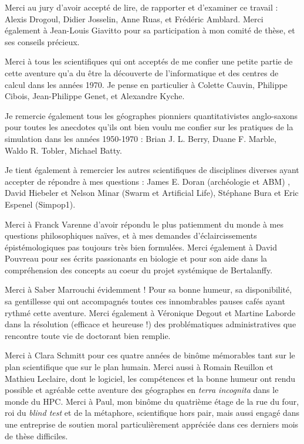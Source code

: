 \medskip
Merci au jury d’avoir accepté de lire, de rapporter et d’examiner ce travail : Alexis Drogoul, Didier Josselin, Anne Ruas, et Frédéric Amblard. Merci également à Jean-Louis Giavitto pour sa participation à mon comité de thèse, et ses conseils précieux.

\medskip
Merci à tous les scientifiques qui ont acceptés de me confier une petite partie de cette aventure qu’a du être la découverte de l’informatique et des centres de calcul dans les années 1970. Je pense en particulier à Colette Cauvin, Philippe Cibois, Jean-Philippe Genet, et Alexandre Kyche.

\medskip
Je remercie également tous les géographes pionniers quantitativistes anglo-saxons pour toutes les anecdotes qu’ils ont bien voulu me confier sur les pratiques de la simulation dans les années 1950-1970 : Brian J. L. Berry, Duane F. Marble, Waldo R. Tobler, Michael Batty.

\medskip
Je tient également à remercier les autres scientifiques de disciplines diverses ayant accepter de répondre à mes questions : James E. Doran (archéologie et ABM) , David Hiebeler et Nelson Minar (Swarm et Artificial Life), Stéphane Bura et Eric Espenel (Simpop1).

\medskip
Merci à Franck Varenne d’avoir répondu le plus patiemment du monde à mes questions philosophiques naïves, et à mes demandes d’éclaircissements épistémologiques pas toujours très bien formulées. Merci également à David Pouvreau pour ses écrits passionants en biologie et pour son aide dans la compréhension des concepts au coeur du projet systémique de Bertalanffy.

\medskip
Merci à Saber Marrouchi évidemment ! Pour sa bonne humeur, sa disponibilité, sa gentillesse qui ont accompagnés toutes ces innombrables pauses cafés ayant rythmé cette aventure. Merci également à Véronique Degout et Martine Laborde dans la résolution (efficace et heureuse !) des problématiques administratives que rencontre toute vie de doctorant bien remplie.

\medskip
Merci à Clara Schmitt pour ces quatre années de binôme mémorables tant sur le plan scientifique que sur le plan humain. Merci aussi à Romain Reuillon et Mathieu Leclaire, dont le logiciel, les compétences et la bonne humeur ont rendu possible et agréable cette aventure des géographes en \textit{terra incognita} dans le monde du HPC. Merci à Paul, mon binôme du quatrième étage de la rue du four, roi du \textit{blind test} et de la métaphore, scientifique hors pair, mais aussi engagé dans une entreprise de soutien moral particulièrement appréciée dans ces derniers mois de thèse difficiles. 

